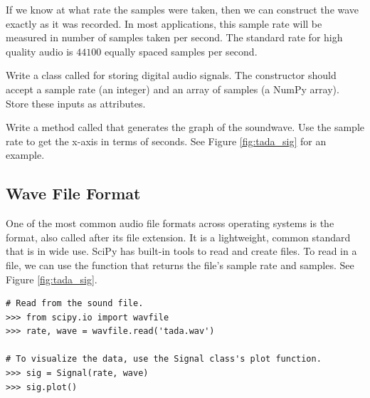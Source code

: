 If we know at what rate the samples were taken, then we can construct the wave exactly as it was recorded.
In most applications, this sample rate will be measured in number of samples taken per second.
The standard rate for high quality audio is $44100$ equally spaced samples per second.

\begin{problem}
Write a class called  for storing digital audio signals.
The constructor should accept a sample rate (an integer) and an array of samples (a NumPy array).
Store these inputs as attributes.

Write a method called  that generates the graph of the soundwave.
Use the sample rate to get the x-axis in terms of seconds.
See Figure \ref{fig:tada_sig} for an example.

\end{problem}

\subsection*{Wave File Format} 

One of the most common audio file formats across operating systems is the  format, also called  after its file extension.
It is a lightweight, common standard that is in wide use.
SciPy has built-in tools to read and create  files.
To read in a  file, we can use the  function that returns the file's sample rate and samples.
See Figure \ref{fig:tada_sig}.

\begin{lstlisting}
# Read from the sound file.
>>> from scipy.io import wavfile
>>> rate, wave = wavfile.read('tada.wav')

# To visualize the data, use the Signal class's plot function.
>>> sig = Signal(rate, wave)
>>> sig.plot()
\end{lstlisting}

